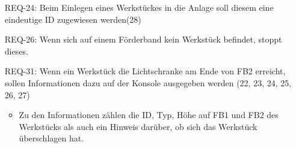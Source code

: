 \begin{itemize}
    \item[REQ-24:] Beim Einlegen eines Werkstückes in die Anlage soll diesem eine eindeutige ID zugewiesen werden(28)
    \item[REQ-26:] Wenn sich auf einem Förderband kein Werkstück befindet, stoppt dieses.
    \item[REQ-31:] Wenn ein Werkstück die Lichtschranke am Ende von FB2 erreicht,
    sollen Informationen dazu auf der Konsole ausgegeben werden (22, 23, 24, 25, 26, 27)
    \begin{itemize}
        \item Zu den Informationen zählen die ID, Typ, Höhe auf FB1 und FB2 des Werkstücks als
        auch ein Hinweis darüber, ob sich das Werkstück überschlagen hat.
    \end{itemize}
\end{itemize}

